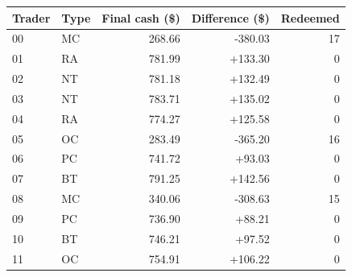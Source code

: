 \begin{tabular}{@{}llrrr@{}}\toprule Trader & Type & Final cash (\$) & Difference (\$) & Redeemed\\\midrule
00 & MC & 268.66 & -380.03 & 17 \\
01 & RA & 781.99 & +133.30 & 0 \\
02 & NT & 781.18 & +132.49 & 0 \\
03 & NT & 783.71 & +135.02 & 0 \\
04 & RA & 774.27 & +125.58 & 0 \\
05 & OC & 283.49 & -365.20 & 16 \\
06 & PC & 741.72 & +93.03 & 0 \\
07 & BT & 791.25 & +142.56 & 0 \\
08 & MC & 340.06 & -308.63 & 15 \\
09 & PC & 736.90 & +88.21 & 0 \\
10 & BT & 746.21 & +97.52 & 0 \\
11 & OC & 754.91 & +106.22 & 0 \\
\bottomrule\end{tabular}
